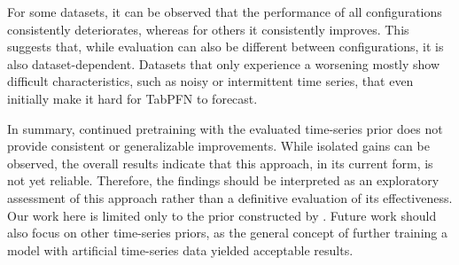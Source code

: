 For some datasets, it can be observed that the performance of all configurations consistently deteriorates, whereas for others it consistently improves.
This suggests that, while evaluation can also be different between configurations, it is also dataset-dependent.
Datasets that only experience a worsening mostly show difficult characteristics, such as noisy or intermittent time series, that even initially make it hard for TabPFN to forecast.

In summary, continued pretraining with the evaluated time-series prior does not provide consistent or generalizable improvements.
While isolated gains can be observed, the overall results indicate that this approach, in its current form, is not yet reliable.
Therefore, the findings should be interpreted as an exploratory assessment of this approach rather than a definitive evaluation of its effectiveness.
\newline
Our work here is limited only to the prior constructed by \citet{dooley2023forecastpfn}.
Future work should also focus on other time-series priors, as the general concept of further training a model with artificial time-series data yielded acceptable results.









